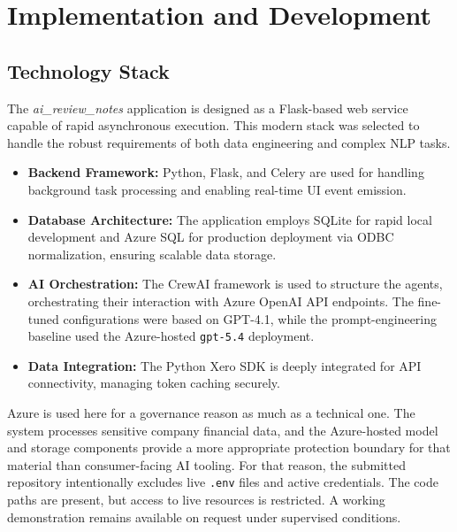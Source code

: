 
\chapter{Implementation and Development}
\label{chap:implementation}

\section{Technology Stack}
The \textit{ai\_review\_notes} application is designed as a Flask-based web service capable of rapid asynchronous execution. This modern stack was selected to handle the robust requirements of both data engineering and complex NLP tasks.
\begin{itemize}
    \item \textbf{Backend Framework:} Python, Flask, and Celery are used for handling background task processing and enabling real-time UI event emission.
    \item \textbf{Database Architecture:} The application employs SQLite for rapid local development and Azure SQL for production deployment via ODBC normalization, ensuring scalable data storage.
    \item \textbf{AI Orchestration:} The CrewAI framework is used to structure the agents, orchestrating their interaction with Azure OpenAI API endpoints. The fine-tuned configurations were based on GPT-4.1, while the prompt-engineering baseline used the Azure-hosted \texttt{gpt-5.4} deployment.
    \item \textbf{Data Integration:} The Python Xero SDK is deeply integrated for API connectivity, managing token caching securely.
\end{itemize}

Azure is used here for a governance reason as much as a technical one. The system processes sensitive company financial data, and the Azure-hosted model and storage components provide a more appropriate protection boundary for that material than consumer-facing AI tooling. For that reason, the submitted repository intentionally excludes live \texttt{.env} files and active credentials. The code paths are present, but access to live resources is restricted. A working demonstration remains available on request under supervised conditions.

